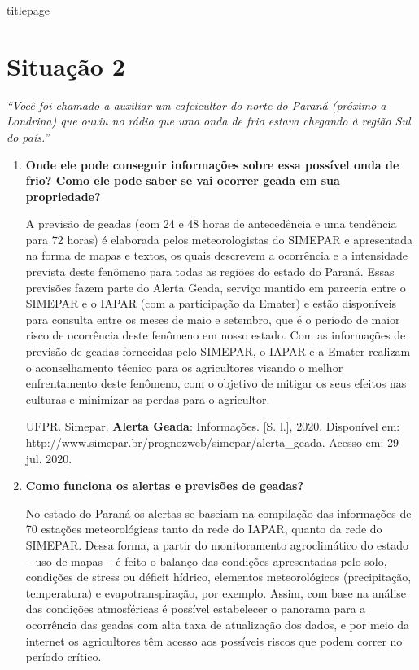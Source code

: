 \documentclass[a4paper, 12pt, brazilian]{article}
\begin{document}
	{titlepage}
	
	\section{Situação 2}
	
	\textit{``Você foi chamado a auxiliar um cafeicultor do norte do Paraná (próximo a Londrina) que ouviu no rádio que uma onda de frio estava chegando à região Sul do país.''}
	
	\begin{enumerate}
		\item\textbf{Onde ele pode conseguir informações sobre essa possível onda de frio? Como ele pode saber se vai ocorrer geada em sua propriedade?}
		
		\hspace{.5cm} A previsão de geadas (com 24 e 48 horas de antecedência e uma tendência para 72 horas) é elaborada pelos meteorologistas do SIMEPAR e apresentada na forma de mapas e textos, os quais descrevem a ocorrência e a intensidade prevista deste fenômeno para todas as regiões do estado do Paraná.
		Essas previsões fazem parte do Alerta Geada, serviço mantido em parceria entre o SIMEPAR e o IAPAR (com a participação da Emater) e estão disponíveis para consulta entre os meses de maio e setembro, que é o período de maior risco de ocorrência deste fenômeno em nosso estado.
		Com as informações de previsão de geadas fornecidas pelo SIMEPAR, o IAPAR e a Emater realizam o aconselhamento técnico para os agricultores visando o melhor enfrentamento deste fenômeno, com o objetivo de mitigar os seus efeitos nas culturas e minimizar as perdas para o agricultor.
		
		UFPR. Simepar. \textbf{Alerta Geada}: Informações. [S. l.], 2020. Disponível em: http://www.simepar.br/prognozweb/simepar/alerta\_geada. Acesso em: 29 jul. 2020.
		
		\item\textbf{Como funciona os alertas e previsões de geadas?}
		
		\hspace{.5cm}No estado do Paraná os alertas se baseiam na compilação das informações de 70 estações meteorológicas tanto da rede do IAPAR, quanto da rede do SIMEPAR. Dessa forma, a partir do monitoramento agroclimático do estado -- uso de mapas -- é feito o balanço das condições apresentadas pelo solo, condições de stress ou déficit hídrico, elementos meteorológicos (precipitação, temperatura) e evapotranspiração, por exemplo. Assim, com base na análise das condições atmosféricas é possível estabelecer o panorama para a ocorrência das geadas com alta taxa de atualização dos dados, e por meio da internet os agricultores têm acesso aos possíveis riscos que podem correr no período crítico.
		

\end{enumerate}
\end{document}
